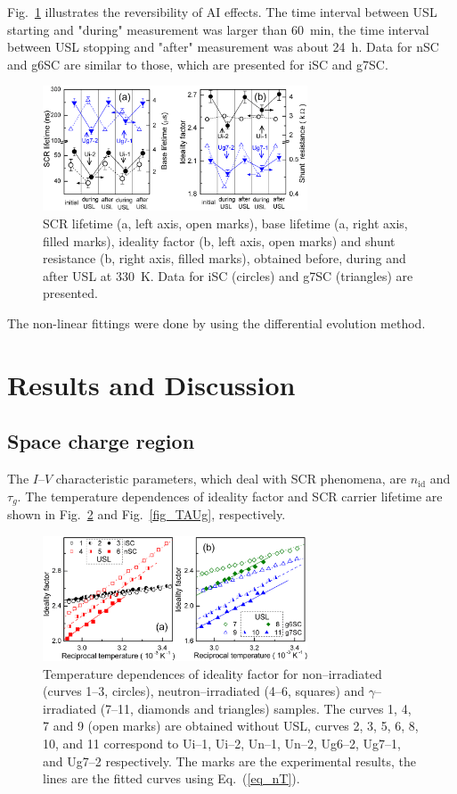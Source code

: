 \documentclass[aip,jap, amsmath,amssymb,reprint]{revtex4-1}
\begin{document}
Fig.~\ref{fig_Reverse} illustrates the reversibility of AI effects.
The time interval between USL starting and "during" measurement was larger than 60~min,
the time interval between USL stopping and "after" measurement was about 24~h.
Data for nSC and g6SC are similar to those, which are presented for iSC and g7SC.

\begin{figure}
\includegraphics[width=0.7\textwidth]{fig_2ab}%
\caption{\label{fig_Reverse}
SCR lifetime (a, left axis, open marks),
base lifetime (a, right axis, filled marks),
ideality factor (b, left axis, open marks) and
shunt resistance (b, right axis, filled marks),
obtained before, during and after USL at 330~K.
Data for iSC (circles) and g7SC (triangles) are presented.
}%
\end{figure}



The non-linear fittings were done by using the differential evolution method.\cite{DEWang}


\section{Results and Discussion}
\subsection{Space charge region\label{SCR}}
The $I$--$V$ characteristic parameters, which deal with SCR phenomena, are $n_{\mathrm{id}}$ and $\tau_{g}$.
The temperature dependences of ideality factor and SCR carrier lifetime are shown in Fig.~\ref{fig_n} and Fig.~\ref{fig_TAUg}, respectively.

\begin{figure}
\includegraphics[width=0.7\textwidth]{fig_3ab}%
\caption{\label{fig_n}
Temperature dependences of ideality factor for non--irradiated (curves 1--3, circles),
neutron--irradiated (4--6, squares) and $\gamma$--irradiated (7--11, diamonds and triangles) samples.
The curves 1, 4, 7 and 9 (open marks) are obtained without USL,
curves 2, 3, 5, 6, 8, 10, and 11 correspond to
Ui--1, Ui--2, Un--1, Un--2, Ug6--2, Ug7--1, and Ug7--2 respectively.
The marks are the experimental results, the lines are the fitted curves using Eq.~(\ref{eq_nT}).
}%
\end{figure}
\end{document}
